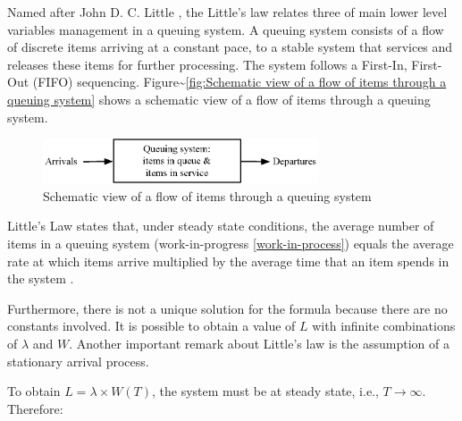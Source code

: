 \documentclass{article}
\begin{document}
Named after John D. C. Little \citep{Little1961}, the Little's law relates three of main lower level variables management in a queuing system.
A queuing system consists of a flow of discrete items arriving at a constant pace, to a stable system that services and releases these items for further processing.
The system follows a First-In, First-Out (FIFO) sequencing.
Figure\textasciitilde{}\ref{fig:Schematic view of a flow of items through a queuing system} shows a schematic view of a flow of items through a queuing system.

\begin{figure}[htbp]
\centering
\includegraphics[height=50]{Figures/Schematic_view_of_a_flow_of_items_through_a_queuing_system.eps}
\caption{\label{fig:org6b3b8de}Schematic view of a flow of items through a queuing system}
\end{figure}


Little's Law states that, under steady state conditions, the average number of items in a queuing system (work-in-progress \ref{work-in-process}) equals the average rate at which items arrive multiplied by the average time that an item spends in the system \citep{Little2008}.

Furthermore, there is not a unique solution for the formula because there are no constants involved.
It is possible to obtain a value of \(L\) with infinite combinations of \(\lambda\) and \(W\).
Another important remark about Little's law is the assumption of a stationary arrival process.

To obtain \(L=\lambda \times W(T)\), the system must be at steady state, i.e., \(T \rightarrow \infty\).
Therefore:
\end{document}
